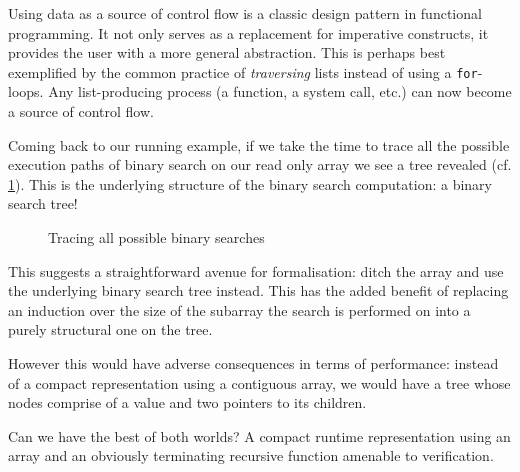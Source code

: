 \documentclass{article}
\begin{document}
Using data as a source of control flow is a classic design pattern in functional
programming. It not only serves as a replacement for imperative constructs, it
provides the user with a more general abstraction. This is perhaps best exemplified
by the common practice of \emph{traversing}
lists instead of using a \texttt{for}-loops. Any list-producing process (a function,
a system call, etc.) can now become a source of control flow.

Coming back to our running example, if we take the time to trace all the possible
execution paths of binary search on our read only array we see a tree revealed
(cf. \cref{fig:searchall}).
This is the underlying structure of the binary search computation: a binary search
tree! 

\begin{figure}
  \center
  \caption{Tracing all possible binary searches}
  \label{fig:searchall}
\end{figure}

This suggests a straightforward avenue for formalisation: ditch the array and
use the underlying binary search tree instead. This has the added benefit of
replacing an induction over the size of the subarray the search is performed on
into a purely structural one on the tree.

However this would have adverse consequences in terms of performance: instead of
a compact representation using a contiguous array, we would have a tree whose nodes
comprise of a value and two pointers to its children.

Can we have the best of both worlds? A compact runtime representation using an
array and an obviously terminating recursive function amenable to verification.

\section{}
\end{document}
